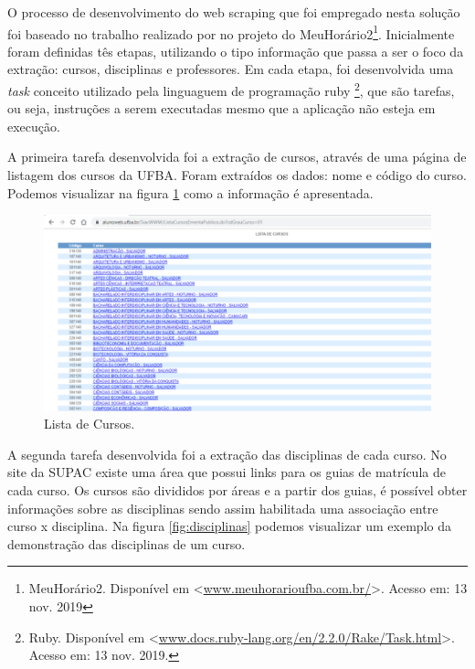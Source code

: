 \documentclass[12pt, a4paper]{report}
\begin{document}
O processo de desenvolvimento do web scraping que foi empregado nesta solução foi baseado no trabalho realizado por \citeauthor{assis2017meuhorario} no projeto do MeuHorário2\footnote{MeuHorário2. Disponível em <\url{www.meuhorarioufba.com.br/}>. Acesso em: 13 nov. 2019}. Inicialmente foram definidas tês etapas, utilizando o tipo informação que passa a ser o foco da extração: cursos, disciplinas e professores.  Em cada etapa, foi desenvolvida uma \textit{task} conceito utilizado pela linguaguem de programação ruby \footnote{Ruby. Disponível em <\url{www.docs.ruby-lang.org/en/2.2.0/Rake/Task.html}>. Acesso em: 13 nov. 2019.}, que são tarefas, ou seja, instruções a serem executadas mesmo que a aplicação não esteja em execução. 

A primeira tarefa desenvolvida foi a extração de cursos, através de uma página de listagem dos cursos da UFBA. Foram extraídos os dados: nome e código do curso. Podemos visualizar na figura \ref{fig:lista_cursos} como a informação é apresentada.

\begin{figure}
\centering
\includegraphics[scale=0.9]{lista_cursos.png}
\caption{Lista de Cursos.}
\label{fig:lista_cursos}
\end{figure}

A segunda tarefa desenvolvida foi a extração das disciplinas de cada curso. No site da \ac{SUPAC} existe uma área que possui links para os guias de matrícula de cada curso. Os cursos são divididos por áreas e a partir dos guias, é possível obter informações sobre as disciplinas sendo assim habilitada uma associação entre curso x disciplina. Na figura \ref{fig:disciplinas} podemos visualizar um exemplo da demonstração das disciplinas de um curso.
\end{document}
